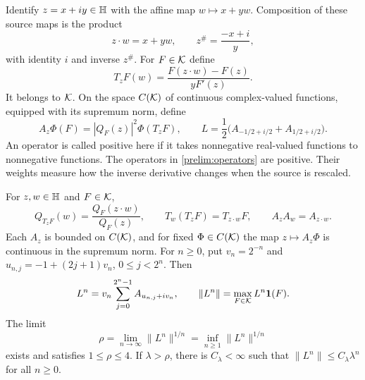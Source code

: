 Identify $z=x+iy\in\mathbb H$ with the affine map $w\mapsto x+yw$.
Composition of these source maps is the product
\begin{equation}
 z\cdot w=x+yw,
 \qquad z^\#=\frac{-x+i}{y},
 \label{prelim:affine-product}
\end{equation}
with identity $i$ and inverse $z^\#$.  For $F\in\mathcal K$ define
\begin{equation}
 T_zF(w)=\frac{F(z\cdot w)-F(z)}{yF'(z)}.
 \label{prelim:rerooting}
\end{equation}
It belongs to $\mathcal K$.  On the space $C(\mathcal K)$ of continuous
complex-valued functions, equipped with its supremum norm, define
\begin{equation}
 A_z\Phi(F)=|Q_F(z)|^2\Phi(T_zF),\qquad
 L=\frac12\bigl(A_{-1/2+i/2}+A_{1/2+i/2}\bigr).
 \label{prelim:operators}
\end{equation}
An operator is called positive here if it takes nonnegative real-valued
functions to nonnegative functions.  The operators in
\eqref{prelim:operators} are positive.  Their weights measure how the
inverse derivative changes when the source is rescaled.

\begin{lemma}
\label{lem:transfer-growth}
For $z,w\in\mathbb H$ and $F\in\mathcal K$,
\begin{equation}
 Q_{T_zF}(w)=\frac{Q_F(z\cdot w)}{Q_F(z)},\qquad
 T_w(T_zF)=T_{z\cdot w}F,\qquad A_zA_w=A_{z\cdot w}.
 \label{prelim:composition}
\end{equation}
Each $A_z$ is bounded on $C(\mathcal K)$, and for fixed $\Phi\in C(\mathcal K)$
the map $z\mapsto A_z\Phi$ is continuous in the supremum norm.
For $n\ge0$, put $v_n=2^{-n}$ and
$u_{n,j}=-1+(2j+1)v_n$, $0\le j<2^n$.  Then
\begin{equation}
 L^n=v_n\sum_{j=0}^{2^n-1} A_{u_{n,j}+iv_n},\qquad
 \|L^n\|=\max_{F\in\mathcal K}L^n\mathbf1(F).
 \label{prelim:dyadic-grid}
\end{equation}
The limit
\begin{equation}
 \rho=\lim_{n\to\infty}\|L^n\|^{1/n}
      =\inf_{n\ge1}\|L^n\|^{1/n}
 \label{prelim:rho}
\end{equation}
exists and satisfies $1\le\rho\le4$.  If $\lambda>\rho$, there is
$C_\lambda<\infty$ such that $\|L^n\|\le C_\lambda\lambda^n$ for
all $n\ge0$.
\end{lemma}

